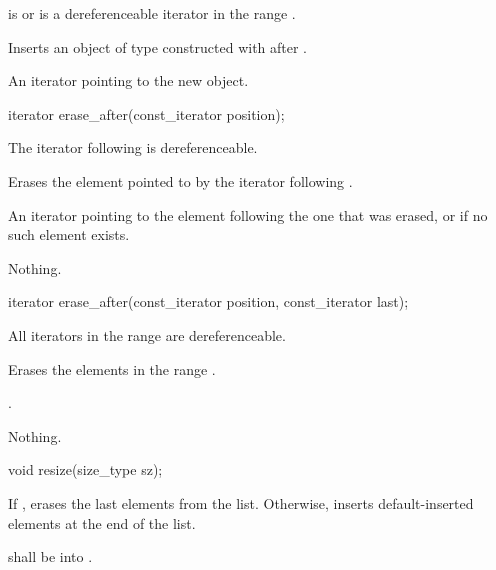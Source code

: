 \begin{itemdescr}
\pnum
\requires {} is  or is a dereferenceable
iterator in the range .

\pnum
\effects Inserts an object of type  constructed with
 after .

\pnum
\returns An iterator pointing to the new object.
\end{itemdescr}

%
\begin{itemdecl}
iterator erase_after(const_iterator position);
\end{itemdecl}

\begin{itemdescr}
\pnum
\requires The iterator following  is dereferenceable.

\pnum
\effects Erases the element pointed to by the iterator following .

\pnum
\returns An iterator pointing to the element following the one that was
erased, or  if no such element exists.

\pnum
\throws Nothing.
\end{itemdescr}

\begin{itemdecl}
iterator erase_after(const_iterator position, const_iterator last);
\end{itemdecl}

\begin{itemdescr}
\pnum
\requires All iterators in the range  are dereferenceable.

\pnum
\effects Erases the elements in the range .

\pnum
\returns {}.

\pnum
\throws Nothing.
\end{itemdescr}

%
\begin{itemdecl}
void resize(size_type sz);
\end{itemdecl}

\begin{itemdescr}
\pnum
\effects If , erases the last  elements from the list. Otherwise, inserts  default-inserted
elements at the end of the list.

\pnum
\requires {} shall be  into .
\end{itemdescr}

